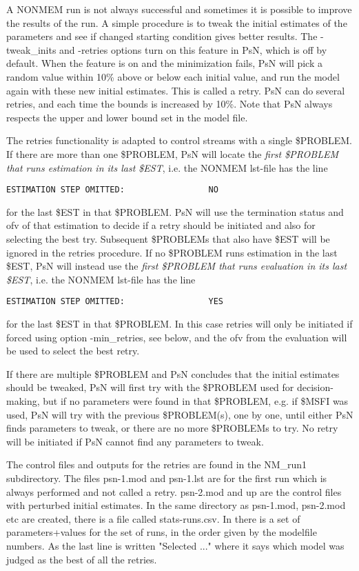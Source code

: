 A NONMEM run is not always successful and sometimes it is possible to improve the results of the run. 
A simple procedure is to tweak the initial 
estimates of the parameters and see if changed starting condition gives better results. 
The -tweak\_inits and -retries options turn on this feature in PsN, 
which is off by default. When the feature is on and the minimization fails, PsN will pick a random value within 10\% above or below each initial value, 
and run the model again with these new initial estimates. This is called a retry. PsN can do several retries, and each time the bounds is 
increased by 10\%. Note that PsN always respects the upper and lower bound set in the model file. 

The retries functionality is adapted to control streams with a single \$PROBLEM. If there are more than one \$PROBLEM, PsN will
locate the \emph{first \$PROBLEM that runs estimation in its last \$EST},
i.e. the NONMEM lst-file has the line 
\begin{verbatim}
ESTIMATION STEP OMITTED:                 NO
\end{verbatim}
for the last \$EST in that \$PROBLEM. PsN will use the
termination status and ofv of
that estimation to decide if a retry should be initiated
and also for selecting the best try. Subsequent \$PROBLEMs that also have \$EST will be ignored in the retries procedure.
If no \$PROBLEM runs estimation in the last \$EST, PsN will instead use
the \emph{first \$PROBLEM that runs evaluation in its last \$EST},
i.e. the NONMEM lst-file has the line 
\begin{verbatim}
ESTIMATION STEP OMITTED:                 YES
\end{verbatim}
for the last \$EST in that \$PROBLEM. In this case retries will only be initiated if forced using option -min\_retries, see below,
and the ofv from the evaluation will be used to select the best retry.

If there are multiple \$PROBLEM and PsN concludes that the initial estimates should be tweaked, PsN will first try with the
\$PROBLEM used for decision-making, but if no parameters were found in that \$PROBLEM, e.g. if \$MSFI was used, PsN will
try with the previous \$PROBLEM(s), one by one, until either PsN finds parameters to tweak, or there are no more \$PROBLEMs to try.
No retry will be initiated if PsN cannot find any parameters to tweak.

The control files and outputs for the retries are found in the NM\_run1 subdirectory. The files psn-1.mod and psn-1.lst are for 
the first run which is always performed and not called a retry. psn-2.mod and up are the control files with perturbed initial 
estimates. In the same directory as psn-1.mod, psn-2.mod etc are created, there is a file called stats-runs.csv. In there is a 
set of parameters+values for the set of runs, in the order given by the modelfile numbers. As the last line is 
written "Selected ..." where it says which model was judged as the best of all the retries.

